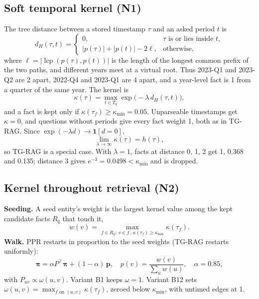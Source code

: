 \subsection{Soft temporal kernel (N1)}
The tree distance between a stored timestamp $\tau$ and an asked period $t$ is
\begin{equation}
  d_H(\tau, t) =
  \begin{cases}
    0, & \tau \text{ is or lies inside } t,\\
    |p(\tau)| + |p(t)| - 2\ell, & \text{otherwise,}
  \end{cases}
  \label{eq:dist}
\end{equation}
where $\ell = |\operatorname{lcp}(p(\tau), p(t))|$ is the length of the longest common prefix of the two paths, and different years meet at a virtual root. Thus 2023-Q1 and 2023-Q2 are 2 apart, 2022-Q4 and 2023-Q1 are 4 apart, and a year-level fact is 1 from a quarter of the same year. The kernel is
\begin{equation}
  \kappa(\tau) = \max_{t \in T_q} \exp\big(-\lambda\, d_H(\tau, t)\big),
  \label{eq:kappa}
\end{equation}
and a fact is kept only if $\kappa(\tau_f) \ge \kappa_{\min} = 0.05$. Unparseable timestamps get $\kappa = 0$, and questions without periods give every fact weight 1, both as in TG-RAG. Since $\exp(-\lambda d) \to \mathbf{1}[d = 0]$,
\begin{equation}
  \lim_{\lambda \to \infty} \kappa(\tau) = h(\tau),
  \label{eq:limit}
\end{equation}
so TG-RAG is a special case. With $\lambda = 1$, facts at distance 0, 1, 2 get 1, 0.368 and 0.135; distance 3 gives $e^{-3} = 0.0498 < \kappa_{\min}$ and is dropped.

\subsection{Kernel throughout retrieval (N2)}
\textbf{Seeding.} A seed entity's weight is the largest kernel value among the kept candidate facts $R_q$ that touch it,
\begin{equation}
  w(v) = \max_{f \in R_q:\; v \in f,\; \kappa(\tau_f) \ge \kappa_{\min}} \kappa(\tau_f).
  \label{eq:seed}
\end{equation}
\textbf{Walk.} PPR restarts in proportion to the seed weights (TG-RAG restarts uniformly):
\begin{equation}
  \bm{\pi} = \alpha P^{\top} \bm{\pi} + (1 - \alpha)\, \mathbf{p}, \quad p(v) = \frac{w(v)}{\sum_u w(u)}, \quad \alpha = 0.85,
  \label{eq:ppr}
\end{equation}
with $P_{uv} \propto \omega(u, v)$. Variant B1 keeps $\omega = 1$. Variant B12 sets $\omega(u, v) = \max_{f \text{ on } (u,v)} \kappa(\tau_f)$, zeroed below $\kappa_{\min}$, with untimed edges at 1.

